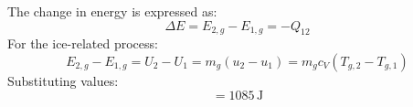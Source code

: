The change in energy is expressed as:  
\[
\Delta E = E_{2,g} - E_{1,g} = -Q_{12}
\]  
For the ice-related process:  
\[
E_{2,g} - E_{1,g} = U_2 - U_1 = m_g (u_2 - u_1) = m_g c_V (T_{g,2} - T_{g,1})
\]  
Substituting values:  
\[
= 1085 \, \text{J}
\]